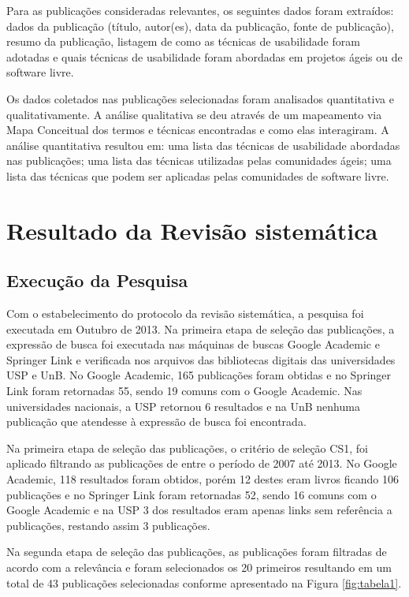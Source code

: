 \documentclass[12pt]{article}
\begin{document}
%
Para as publicações consideradas relevantes, os seguintes dados foram extraídos: dados da publicação (título, autor(es), data da publicação, fonte de publicação), resumo da publicação, listagem de como as técnicas de usabilidade foram adotadas e quais técnicas de usabilidade foram abordadas em projetos ágeis ou de software livre.

%
Os dados coletados nas publicações selecionadas foram analisados quantitativa e qualitativamente. A análise qualitativa se deu através de um mapeamento via Mapa Conceitual dos termos e técnicas encontradas e como elas interagiram. A análise quantitativa resultou em: uma lista das técnicas de usabilidade abordadas nas publicações; uma lista das técnicas utilizadas pelas comunidades ágeis; uma lista das técnicas que podem ser aplicadas pelas comunidades de software livre.

\section{Resultado da Revisão sistemática}
\label{sec:result_rev_sis}
\subsection{Execução da Pesquisa}

Com o estabelecimento do protocolo da revisão sistemática, a pesquisa foi executada em Outubro de 2013. Na primeira etapa de seleção das publicações, a expressão de busca foi executada nas máquinas de buscas Google Academic e Springer Link e verificada nos  arquivos  das bibliotecas digitais das universidades USP e UnB. No Google Academic, 165 publicações foram obtidas e no Springer Link foram retornadas 55, sendo 19 comuns com o Google Academic. Nas universidades nacionais, a USP retornou 6 resultados e na UnB nenhuma publicação que atendesse à expressão de busca foi encontrada.

%
Na primeira etapa de seleção das publicações, o critério de seleção CS1, foi aplicado filtrando as publicações de entre o período de 2007 até 2013. No Google Academic, 118 resultados foram obtidos, porém 12 destes eram livros ficando 106 publicações e no Springer Link foram retornadas 52, sendo 16 comuns com o Google Academic e na USP 3 dos resultados eram apenas links sem referência a publicações, restando assim 3 publicações.

%
Na segunda etapa de seleção das publicações, as publicações foram filtradas de acordo com a relevância e foram selecionados os 20 primeiros resultando em um total de 43 publicações selecionadas conforme apresentado na Figura \ref{fig:tabela1}.
\end{document}
